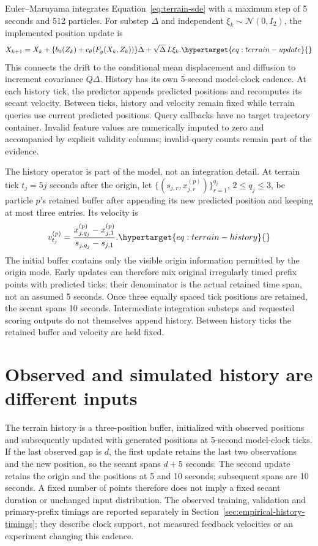Euler--Maruyama integrates Equation~\eqref{eq:terrain-sde} with a maximum step
of 5 seconds and 512 particles. For substep \(\Delta\) and independent
\(\xi_k\sim\mathcal N(0,I_2)\), the implemented position update is
\begin{equation}
 X_{k+1}=X_k+\{b_0(Z_k)+c_\theta(F_g(X_k,Z_k))\}\Delta
             +\sqrt{\Delta}\,L\xi_k .
 \label{eq:terrain-update}\hypertarget{eq:terrain-update}{}
\end{equation}
This connects the drift to the conditional mean displacement and diffusion
to increment covariance \(Q\Delta\). History has its own 5-second model-clock cadence.
At each history tick, the predictor appends predicted positions and recomputes
its secant velocity. Between ticks, history and velocity remain fixed while
terrain queries use current predicted positions. Query callbacks have no
target trajectory container. Invalid feature values are numerically imputed
to zero and accompanied by explicit validity columns; invalid-query counts
remain part of the evidence.

The history operator is part of the model, not an integration detail.
At terrain tick \(t_j=5j\) seconds after the origin, let
\(\{(s_{j,r},x^{(p)}_{j,r})\}_{r=1}^{q_j}\), \(2\le q_j\le3\),
be particle \(p\)'s retained buffer after appending its new predicted position
and keeping at most three entries. Its velocity is
\begin{equation}
 v^{(p)}_{t_j}=\frac{x^{(p)}_{j,q_j}-x^{(p)}_{j,1}}
                         {s_{j,q_j}-s_{j,1}} .
 \label{eq:terrain-history}\hypertarget{eq:terrain-history}{}
\end{equation}
The initial buffer contains only the visible origin information permitted by
the origin mode. Early updates can therefore mix original irregularly timed
prefix points with predicted ticks; their denominator is the actual retained
time span, not an assumed 5 seconds. Once three equally spaced tick positions
are retained, the secant spans 10 seconds. Intermediate integration substeps
and requested scoring outputs do not themselves append history. Between
history ticks the retained buffer and velocity are held fixed.


\section{Observed and simulated history are different inputs}
\label{sec:history-feedback}\hypertarget{sec:history-feedback}{}
The terrain history is a three-position buffer, initialized with observed
positions and subsequently updated with generated positions at 5-second
model-clock ticks. If the last observed gap is \(d\), the first update
retains the last two observations and the new position, so the secant spans
\(d+5\) seconds. The second update retains the origin and the positions
at 5 and 10 seconds; subsequent spans are 10 seconds. A fixed number of
points therefore does not imply a fixed secant duration or unchanged
input distribution. The observed training, validation and primary-prefix
timings are reported separately in
Section~\ref{sec:empirical-history-timings}; they describe clock support,
not measured feedback velocities or an experiment changing this cadence.


